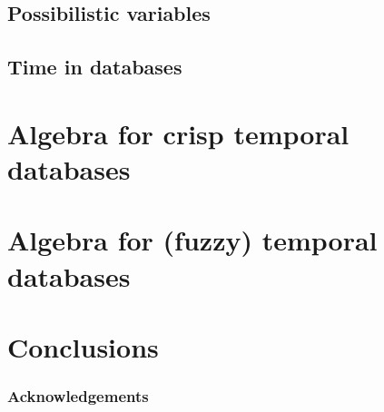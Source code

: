 \documentclass{llncs}
\begin{document}
\subsection{Possibilistic variables}

\subsection{Time in databases}
%


%
\section{\label{sec:prop}Algebra for crisp temporal databases}
%




\section{Algebra for (fuzzy) temporal databases}



%
\section{\label{sec:conc}Conclusions}
%
%
%
\subsubsection{Acknowledgements}
%






\end{document}
